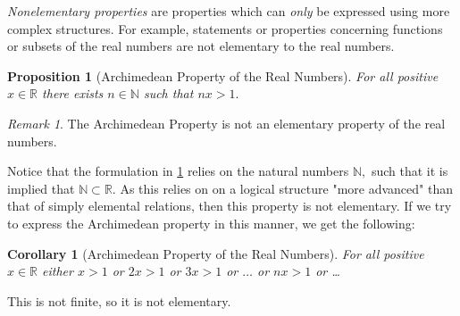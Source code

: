 \documentclass[12pt]{amsart}
\newcommand{\NN}{\mathbb{N}}
\newcommand{\RR}{\mathbb{R}}
\theoremstyle{plain}
\newtheorem{cor}[thm]{Corollary}
\newtheorem{prop}[thm]{Proposition}
\theoremstyle{definition}
\theoremstyle{remark}
\newtheorem{rem}[thm]{Remark}
\theoremstyle{theorem}
\numberwithin{equation}{section}
\numberwithin{thm}{section}
\begin{document}
\textit{Nonelementary properties} are properties which can \textit{only} be expressed using more complex structures. For example, statements or properties concerning functions or subsets of the real numbers are not elementary to the real numbers. 
\begin{prop}[Archimedean Property of the Real Numbers]
\label{archimedeanproperty}
For all positive $x \in \RR$ there exists $n \in \NN$ such that $nx > 1.$
\end{prop}
\begin{rem}
The Archimedean Property is not an elementary property of the real numbers. 
\end{rem}
Notice that the formulation in \ref{archimedeanproperty} relies on the natural numbers $\NN,$ such that it is implied that $\NN \subset \RR.$ As this relies on on a logical structure "more advanced" than that of simply elemental relations, then this property is not elementary. If we try to express the Archimedean property in this manner, we get the following:
\begin{cor}[Archimedean Property of the Real Numbers]
    For all positive $x \in \RR$ either $x>1$ or $2x>1$ or $3x>1$ or $\ldots$ or $nx>1$ or \ldots
\end{cor}
This is not finite, so it is not elementary. 
\end{document}
